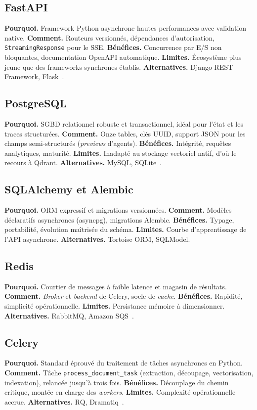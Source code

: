 \subsection{FastAPI}
\textbf{Pourquoi.} Framework Python asynchrone hautes performances avec validation
native. \textbf{Comment.} Routeurs versionnés, dépendances d'autorisation,
\texttt{StreamingResponse} pour le SSE. \textbf{Bénéfices.} Concurrence par E/S
non bloquantes, documentation OpenAPI automatique. \textbf{Limites.} Écosystème
plus jeune que des frameworks synchrones établis. \textbf{Alternatives.} Django
REST Framework, Flask~\cite{fastapi}.

\subsection{PostgreSQL}
\textbf{Pourquoi.} SGBD relationnel robuste et transactionnel, idéal pour l'état et
les traces structurées. \textbf{Comment.} Onze tables, clés UUID, support JSON
pour les champs semi-structurés (\emph{previews} d'agents). \textbf{Bénéfices.}
Intégrité, requêtes analytiques, maturité. \textbf{Limites.} Inadapté au stockage
vectoriel natif, d'où le recours à Qdrant. \textbf{Alternatives.} MySQL,
SQLite~\cite{postgres}.

\subsection{SQLAlchemy et Alembic}
\textbf{Pourquoi.} ORM expressif et migrations versionnées. \textbf{Comment.}
Modèles déclaratifs asynchrones (asyncpg), migrations Alembic. \textbf{Bénéfices.}
Typage, portabilité, évolution maîtrisée du schéma. \textbf{Limites.} Courbe
d'apprentissage de l'API asynchrone. \textbf{Alternatives.} Tortoise ORM,
SQLModel.

\subsection{Redis}
\textbf{Pourquoi.} Courtier de messages à faible latence et magasin de résultats.
\textbf{Comment.} \emph{Broker} et \emph{backend} de Celery, socle de \emph{cache}.
\textbf{Bénéfices.} Rapidité, simplicité opérationnelle. \textbf{Limites.}
Persistance mémoire à dimensionner. \textbf{Alternatives.} RabbitMQ,
Amazon SQS~\cite{redis}.

\subsection{Celery}
\textbf{Pourquoi.} Standard éprouvé du traitement de tâches asynchrones en Python.
\textbf{Comment.} Tâche \texttt{process\_document\_task} (extraction, découpage,
vectorisation, indexation), relancée jusqu'à trois fois. \textbf{Bénéfices.}
Découplage du chemin critique, montée en charge des \emph{workers}.
\textbf{Limites.} Complexité opérationnelle accrue. \textbf{Alternatives.} RQ,
Dramatiq~\cite{celery}.


